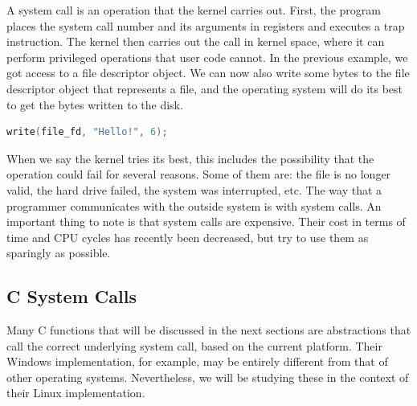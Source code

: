 A system call is an operation that the kernel carries out.
First, the program places the system call number and its arguments in registers and executes a trap instruction.
The kernel then carries out the call in kernel space, where it can perform privileged operations that user code cannot.
In the previous example, we got access to a file descriptor object.
We can now also write some bytes to the file descriptor object that represents a file, and the operating system will do its best to get the bytes written to the disk.

\begin{lstlisting}[language=C]
write(file_fd, "Hello!", 6);
\end{lstlisting}

When we say the kernel tries its best, this includes the possibility that the operation could fail for several reasons.
Some of them are: the file is no longer valid, the hard drive failed, the system was interrupted, etc.
The way that a programmer communicates with the outside system is with system calls.
An important thing to note is that system calls are expensive.
Their cost in terms of time and CPU cycles has recently been decreased, but try to use them as sparingly as possible.

\subsection{C System Calls}

Many C functions that will be discussed in the next sections are abstractions that call the correct underlying system call, based on the current platform. 
Their Windows implementation, for example, may be entirely different from that of other operating systems.
Nevertheless, we will be studying these in the context of their Linux implementation.

